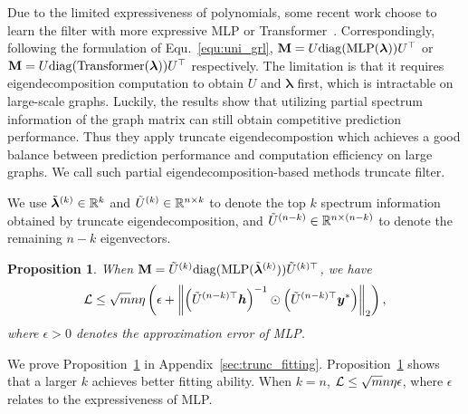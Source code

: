 \documentclass{article} %
\def\vlambda{{\bm\lambda}}
\newtheorem{proposition}{\textbf{Proposition}} %
\begin{document}
Due to the limited expressiveness of polynomials, some recent work choose to learn the filter with more expressive MLP or Transformer~\citep{lingam2022piece,yang2022spectrum,bo2022specformer}.
Correspondingly, following the formulation of Equ.~\ref{equ:uni_grl}, $\rmM=U\mathrm{diag}(\mathrm{MLP}(\vlambda))U^{\top}$ or $\rmM=U\mathrm{diag}(\mathrm{Transformer}(\vlambda))U^{\top}$ respectively.
The limitation is that it requires eigendecomposition computation to obtain $U$ and $\vlambda$ first, which is intractable on large-scale graphs.
Luckily, the results show that utilizing partial spectrum information of the graph matrix can still obtain competitive prediction performance.
Thus they apply truncate eigendecompostion which achieves a good balance between prediction performance and computation efficiency on large graphs.
We call such partial eigendecomposition-based methods truncate filter.

We use $\tilde\vlambda^{(k)}\in\sR^k$ and $\tilde U^{(k)}\in{\mathbb{R}}^{n\times k}$ to denote the top $k$ spectrum information obtained by truncate eigendecomposition, and $\tilde U^{(n-k)}\in{\mathbb{R}}^{n\times(n-k)}$ to denote the remaining $n-k$ eigenvectors.
\begin{proposition}
	\label{prop:trunc_fitting}
	When $\rmM=\tilde U^{(k)}\mathrm{diag}(\mathrm{MLP}(\tilde\vlambda^{(k)}))\tilde U^{(k)\top}$, we have
	\begin{equation}
		\label{equ:bound_trunc}
		\begin{aligned}
			{\mathcal{L}}\leq\sqrt{m}n\eta\left(\epsilon+\left\|\left(\tilde U^{(n-k)\top}{\bm{h}}\right)^{-1}\odot\left(\tilde U^{(n-k)\top}{\bm{y}}^*\right)\right\|_2\right),
		\end{aligned}
	\end{equation}
	where $\epsilon>0$ denotes the approximation error of MLP.
\end{proposition}
We prove Proposition~\ref{prop:trunc_fitting} in Appendix~\ref{sec:trunc_fitting}.
Proposition~\ref{prop:trunc_fitting} shows that a larger $k$ achieves better fitting ability.
When $k=n$, ${\mathcal{L}}\leq\sqrt{m}n\eta\epsilon$, where $\epsilon$ relates to the expressiveness of MLP.
\end{document}
